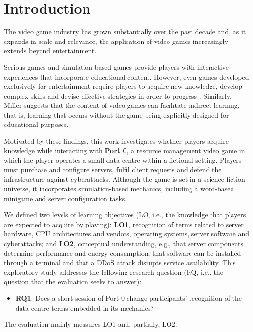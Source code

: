 \documentclass[runningheads]{llncs}
\begin{document}
\section{Introduction}

The video game industry has grown substantially over the past decade and, as it expands in scale and relevance, the application of video games increasingly extends beyond entertainment.

Serious games and simulation-based games provide players with interactive experiences that incorporate educational content. However, even games developed exclusively for entertainment require players to acquire new knowledge, develop complex skills and devise effective strategies in order to progress \cite{Martens2008}. Similarly, Miller \cite{Monica_Miller} suggests that the content of video games can facilitate indirect learning, that is, learning that occurs without the game being explicitly designed for educational purposes.

Motivated by these findings, this work investigates whether players acquire knowledge while interacting with \textbf{Port 0}, a resource management video game in which the player operates a small data centre within a fictional setting. Players must purchase and configure servers, fulfil client requests and defend the infrastructure against cyberattacks. Although the game is set in a science fiction universe, it incorporates simulation-based mechanics, including a word-based minigame and server configuration tasks.

We defined two levels of learning objectives (LO, i.e., the knowledge that players are expected to acquire by playing): \textbf{LO1}, recognition of terms related to server hardware, CPU architectures and vendors, operating systems, server software and cyberattacks; and \textbf{LO2}, conceptual understanding, e.g., that server components determine performance and energy consumption, that software can be installed through a terminal and that a DDoS attack disrupts service availability. This exploratory study addresses the following research question (RQ, i.e., the question that the evaluation seeks to answer):
\begin{itemize}
\item \textbf{RQ1}: Does a short session of Port 0 change participants' recognition of the data centre terms embedded in its mechanics?
\end{itemize}
The evaluation mainly measures LO1 and, partially, LO2.
%
\end{document}
